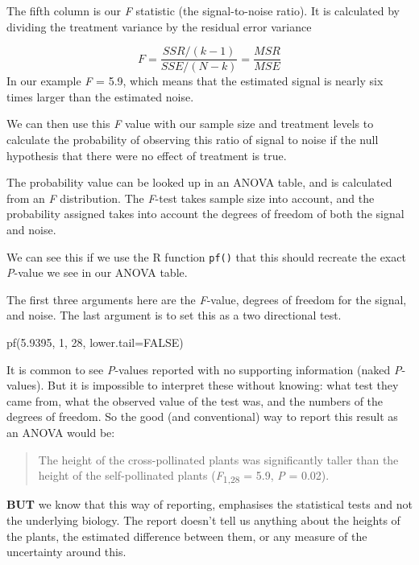 \documentclass[
]{book}
\newenvironment{Shaded}{\begin{snugshade}}{\end{snugshade}}
\newcommand{\AttributeTok}[1]{\textcolor[rgb]{0.77,0.63,0.00}{#1}}
\newcommand{\ConstantTok}[1]{\textcolor[rgb]{0.00,0.00,0.00}{#1}}
\newcommand{\DecValTok}[1]{\textcolor[rgb]{0.00,0.00,0.81}{#1}}
\newcommand{\FloatTok}[1]{\textcolor[rgb]{0.00,0.00,0.81}{#1}}
\newcommand{\FunctionTok}[1]{\textcolor[rgb]{0.00,0.00,0.00}{#1}}
\newcommand{\NormalTok}[1]{#1}
\begin{document}
The fifth column is our \emph{F} statistic (the signal-to-noise ratio). It is calculated by dividing the treatment variance by the residual error variance

\[ F =\frac{SSR/(k-1)}{SSE/(N-k)} =  \frac{MSR}{MSE} \]
In our example \emph{F} = 5.9, which means that the estimated signal is nearly six times larger than the estimated noise.

We can then use this \emph{F} value with our sample size and treatment levels to calculate the probability of observing this ratio of signal to noise if the null hypothesis that there were no effect of treatment is true.

The probability value can be looked up in an ANOVA table, and is calculated from an \emph{F} distribution. The \emph{F}-test takes sample size into account, and the probability assigned takes into account the degrees of freedom of both the signal and noise.

We can see this if we use the R function \texttt{pf()} that this should recreate the exact \emph{P}-value we see in our ANOVA table.

The first three arguments here are the \emph{F}-value, degrees of freedom for the signal, and noise. The last argument is to set this as a two directional test.

\begin{Shaded}
\begin{Highlighting}[]
\FunctionTok{pf}\NormalTok{(}\FloatTok{5.9395}\NormalTok{, }\DecValTok{1}\NormalTok{, }\DecValTok{28}\NormalTok{, }\AttributeTok{lower.tail=}\ConstantTok{FALSE}\NormalTok{)}
\end{Highlighting}
\end{Shaded}

It is common to see \emph{P}-values reported with no supporting information (naked \emph{P}-values). But it is impossible to interpret these without knowing: what test they came from, what the observed value of the test was, and the numbers of the degrees of freedom. So the good (and conventional) way to report this result as an ANOVA would be:

\begin{quote}
The height of the cross-pollinated plants was significantly taller than the height of the self-pollinated plants (\emph{F}\textsubscript{1,28} = 5.9, \emph{P} = 0.02).
\end{quote}

\textbf{BUT} we know that this way of reporting, emphasises the statistical tests and not the underlying biology. The report doesn't tell us anything about the heights of the plants, the estimated difference between them, or any measure of the uncertainty around this.
\end{document}
